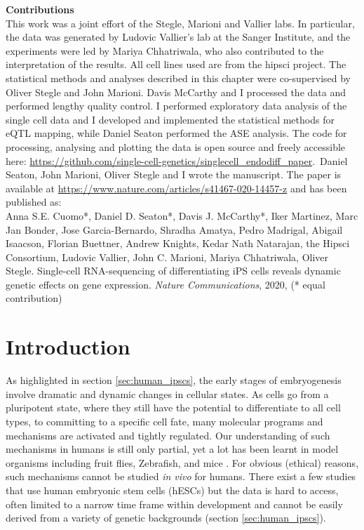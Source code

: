 \begin{Comment2}\label{contr:chapter4}
\hspace{-3mm}\textbf{Contributions} \\
This work was a joint effort of the Stegle, Marioni and Vallier labs. 
In particular, the data was generated by Ludovic Vallier’s lab at the Sanger Institute, and the experiments were led by Mariya Chhatriwala, who also contributed to the interpretation of the results. 
All cell lines used are from the \gls{hipsci} project.
The statistical methods and analyses described in this chapter were co-supervised by Oliver Stegle and John Marioni. 
Davis McCarthy and I processed the data and performed lengthy quality control.
I performed exploratory data analysis of the single cell data and I developed and implemented the statistical methods for eQTL mapping, while Daniel Seaton performed the ASE analysis.
The code for processing, analysing and plotting the data is open source and freely accessible here: \url{https://github.com/single-cell-genetics/singlecell\_endodiff\_paper}.\
Daniel Seaton, John Marioni, Oliver Stegle and I wrote the manuscript. 
The paper \cite{cuomo2020single} is available at \url{https://www.nature.com/articles/s41467-020-14457-z} and has been published as:\\

Anna S.E. Cuomo*, Daniel D. Seaton*, Davis J. McCarthy*, Iker Martinez, Marc Jan Bonder, Jose Garcia-Bernardo, Shradha Amatya, Pedro Madrigal, Abigail Isaacson, Florian Buettner, Andrew Knights, Kedar Nath Natarajan, the Hipsci Consortium, Ludovic Vallier, John C. Marioni, Mariya Chhatriwala, Oliver Stegle. Single-cell RNA-sequencing of differentiating iPS cells reveals dynamic genetic effects on gene expression. \textit{Nature Communications}, 2020, (* equal contribution)

\end{Comment2}

\newpage

\section{Introduction}

As highlighted in section \ref{sec:human_ipscs}, the early stages of embryogenesis involve dramatic and dynamic changes in cellular states. 
As cells go from a pluripotent state, where they still have the potential to differentiate to all cell types, to committing to a specific cell fate, many molecular programs and mechanisms are activated and tightly regulated.
Our understanding of such mechanisms in humans is still only partial, yet a lot has been learnt in model organisms including fruit flies, Zebrafish, and mice \cite{}. 
For obvious (ethical) reasons, such mechanisms cannot be studied \textit{in vivo} for humans. 
There exist a few studies that use human embryonic stem cells (hESCs) but the data is hard to access, often limited to a narrow time frame within development and cannot be easily derived from a variety of genetic backgrounds \cite{} (section \ref{sec:human_ipscs}). \\


